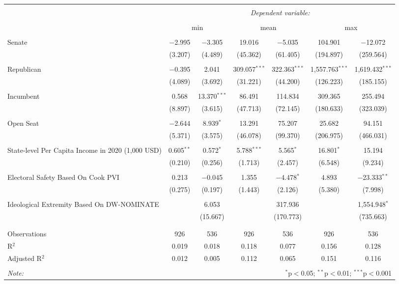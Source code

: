 
\begin{tabular}{@{\extracolsep{5pt}}lcccccc} 
\\[-1.8ex]\hline 
\hline \\[-1.8ex] 
 & \multicolumn{6}{c}{\textit{Dependent variable:}} \\ 
\cline{2-7} 
\\[-1.8ex] & \multicolumn{2}{c}{min} & \multicolumn{2}{c}{mean} & \multicolumn{2}{c}{max} \\ 
\hline \\[-1.8ex] 
 Senate & $-$2.995 & $-$3.305 & 19.016 & $-$5.035 & 104.901 & $-$12.072 \\ 
  & (3.207) & (4.489) & (45.362) & (61.405) & (194.897) & (259.564) \\ 
  & & & & & & \\ 
 Republican & $-$0.395 & 2.041 & 309.057$^{***}$ & 322.363$^{***}$ & 1,557.763$^{***}$ & 1,619.432$^{***}$ \\ 
  & (4.089) & (3.692) & (31.221) & (44.200) & (126.223) & (185.155) \\ 
  & & & & & & \\ 
 Incumbent & 0.568 & 13.370$^{***}$ & 86.491 & 114.834 & 309.365 & 255.494 \\ 
  & (8.897) & (3.615) & (47.713) & (72.145) & (180.633) & (323.039) \\ 
  & & & & & & \\ 
 Open Seat & $-$2.644 & 8.939$^{*}$ & 13.291 & 75.207 & 25.682 & 94.151 \\ 
  & (5.371) & (3.575) & (46.078) & (99.370) & (206.975) & (466.031) \\ 
  & & & & & & \\ 
 State-level Per Capita Income in 2020 (1,000 USD) & 0.605$^{**}$ & 0.572$^{*}$ & 5.788$^{***}$ & 5.565$^{*}$ & 16.801$^{*}$ & 15.194 \\ 
  & (0.210) & (0.256) & (1.713) & (2.457) & (6.548) & (9.234) \\ 
  & & & & & & \\ 
 Electoral Safety Based On Cook PVI & 0.213 & $-$0.045 & 1.355 & $-$4.478$^{*}$ & 4.893 & $-$23.333$^{**}$ \\ 
  & (0.275) & (0.197) & (1.443) & (2.126) & (5.380) & (7.998) \\ 
  & & & & & & \\ 
 Ideological Extremity Based On DW-NOMINATE &  & 6.053 &  & 317.936 &  & 1,554.948$^{*}$ \\ 
  &  & (15.667) &  & (170.773) &  & (735.663) \\ 
  & & & & & & \\ 
\hline \\[-1.8ex] 
Observations & 926 & 536 & 926 & 536 & 926 & 536 \\ 
R$^{2}$ & 0.019 & 0.018 & 0.118 & 0.077 & 0.156 & 0.128 \\ 
Adjusted R$^{2}$ & 0.012 & 0.005 & 0.112 & 0.065 & 0.151 & 0.116 \\ 
\hline 
\hline \\[-1.8ex] 
\textit{Note:}  & \multicolumn{6}{r}{$^{*}$p$<$0.05; $^{**}$p$<$0.01; $^{***}$p$<$0.001} \\ 
\end{tabular} 
